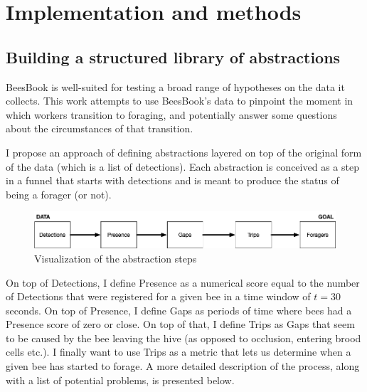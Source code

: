 
\chapter{Implementation and methods}  %

\ifpdf
    \graphicspath{{Chapters/Chapter3/Figs/Raster/}{Chapters/Chapter3/Figs/PDF/}{Chapters/Chapter3/Figs/}}
\else
    \graphicspath{{Chapters/Chapter3/Figs/Vector/}{Chapters/Chapter3/Figs/}}
\fi


\section{Building a structured library of abstractions}

BeesBook is well-suited for testing a broad range of hypotheses %
on the data it collects. This work attempts to use BeesBook’s data
to pinpoint the moment in which workers transition to foraging, and potentially
answer some questions about the circumstances of that transition. 

I propose an approach of defining abstractions layered on top of the original
form of the data (which is a list of detections). Each abstraction is conceived
as a step in a funnel that starts with detections and is meant to produce the
status of being a forager (or not).

\begin{figure}[htbp!] 
\centering    
\includegraphics[width=1.0\textwidth]{basic_funnel}
\caption[basic-funnel]{Visualization of the abstraction steps}
\label{fig:basic_funnel}
\end{figure}


On top of Detections, I define Presence as a numerical score equal to the
number of Detections that were registered for a given bee in a time window of
$t=30$ seconds. On top of Presence, I define Gaps as periods of time where bees
had a Presence score of zero or close. On top of that, I define Trips as Gaps that
seem to be caused by the bee leaving the hive (as opposed to occlusion, entering
brood cells etc.). I finally want to use Trips as a metric that lets us determine when
a given bee has started to forage. A more detailed description of the process,
along with a list of potential problems, is presented below.

